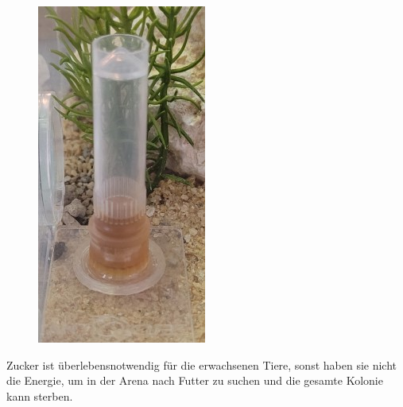 \begin{figure}
  \centering
  \includegraphics[width=.95\linewidth]{resources/Zucker-Fuellstand.jpg}
\end{figure}

Zucker ist überlebensnotwendig für die erwachsenen Tiere, sonst haben sie nicht die Energie,
um in der Arena nach Futter zu suchen und die gesamte Kolonie kann sterben.


